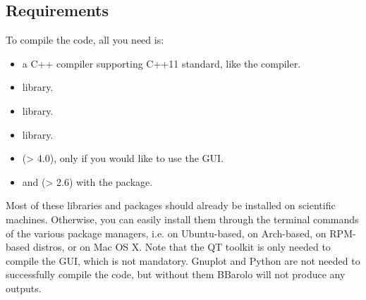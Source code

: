 \documentclass[letterpaper,10pt,english]{sphinxmanual}
\begin{document}
\subsection{Requirements}
\label{\detokenize{installing:id1}}\label{\detokenize{installing:requirements}}
To compile the code, all you need is:
\begin{itemize}
\item {} 
a C++ compiler supporting C++11 standard, like the  compiler.

\item {} 
 library.

\item {} 
 library.

\item {} 
 library.

\item {} 
 (\textgreater{} 4.0), only if you would like to use the GUI.

\item {} 
 and  (\textgreater{} 2.6) with the  package.

\end{itemize}

Most of these libraries and packages should already be installed on scientific machines. Otherwise, you can easily install them through the terminal commands of the various package managers, i.e.  on Ubuntu-based,  on Arch-based,  on RPM-based distros,  or  on Mac OS X. Note that the QT toolkit is only needed to compile the GUI, which is not mandatory. Gnuplot and Python are not needed to successfully compile the code, but without them BBarolo will not produce any outputs.
\end{document}
